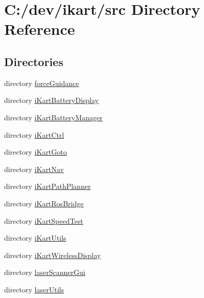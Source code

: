 \section{C\+:/dev/ikart/src Directory Reference}
\label{dir_68267d1309a1af8e8297ef4c3efbcdba}
\subsection*{Directories}
\begin{DoxyCompactItemize}
\item 
directory \hyperlink{dir_0b8668989739bf2a3264b87dfe58852e}{force\+Guidance}
\item 
directory \hyperlink{dir_16017327ba2decd97fc66ef9d486722f}{i\+Kart\+Battery\+Display}
\item 
directory \hyperlink{dir_7781abbb08dbf6f7d0520cecf7700c82}{i\+Kart\+Battery\+Manager}
\item 
directory \hyperlink{dir_c1c9f02a4bf2261e5e62d7b9847944b2}{i\+Kart\+Ctrl}
\item 
directory \hyperlink{dir_1f1b800b93334c439b3cc6665b68b74f}{i\+Kart\+Goto}
\item 
directory \hyperlink{dir_b26c74f12371d83fa8a0742d7e10dc7b}{i\+Kart\+Nav}
\item 
directory \hyperlink{dir_7335d887aad74a65ded84584de18e44d}{i\+Kart\+Path\+Planner}
\item 
directory \hyperlink{dir_a0e55278d74a697a561daad0a0dec219}{i\+Kart\+Ros\+Bridge}
\item 
directory \hyperlink{dir_0d809422b59c685fcb77601a1b4c3a06}{i\+Kart\+Speed\+Test}
\item 
directory \hyperlink{dir_66f460a5efc4ddf8c9c7da9b3e3e46fc}{i\+Kart\+Utils}
\item 
directory \hyperlink{dir_4d5aca832f9c0672e285fce6aa9a27ae}{i\+Kart\+Wireless\+Display}
\item 
directory \hyperlink{dir_45f6e956f71aa06d3df074bcc5e0dcc3}{laser\+Scanner\+Gui}
\item 
directory \hyperlink{dir_40768bbde37f5af8e4fea91d77c97b49}{laser\+Utils}
\end{DoxyCompactItemize}
